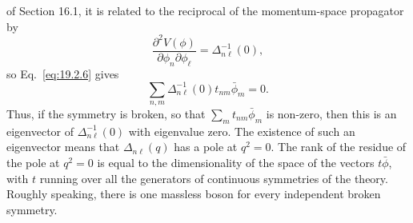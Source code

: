 of Section 16.1, it is related to the reciprocal of the momentum-space
propagator by
\begin{equation}
 \frac{\partial^2V(\phi)}{\partial\phi_n\partial\phi_\ell}
 =\Delta^{-1}_{n\ell}(0),
 \tag{19.2.7}\label{eq:19.2.7}
\end{equation}
so Eq.~\eqref{eq:19.2.6} gives
\begin{equation}
 \sum_{n,m}\Delta^{-1}_{n\ell}(0)t_{nm}\bar\phi_m=0.
 \tag{19.2.8}\label{eq:19.2.8}
\end{equation}
Thus, if the symmetry is broken, so that $\sum_m t_{nm}\bar\phi_m$ is
non-zero, then this is an eigenvector of $\Delta^{-1}_{n\ell}(0)$ with
eigenvalue zero. The existence of such an eigenvector means that
$\Delta_{n\ell}(q)$ has a pole at $q^2=0$. The rank of the residue of the pole
at $q^2=0$ is equal to the dimensionality of the space of the vectors
$t\bar\phi$, with $t$ running over all the generators of continuous
symmetries of the theory. Roughly speaking, there is one massless boson for
every independent broken symmetry.

